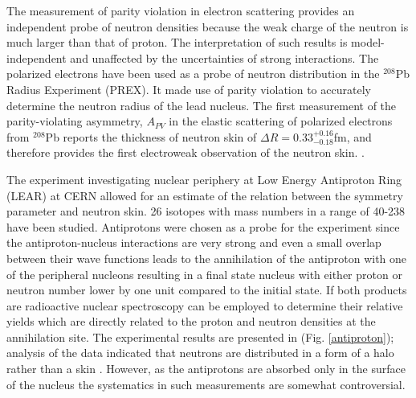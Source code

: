 \indent The measurement of parity violation in electron scattering provides an independent probe of neutron densities because the weak charge of the neutron is much larger than that of proton. The interpretation of such results is model-independent and unaffected by the uncertainties of strong interactions. The polarized electrons have been used as a probe of neutron distribution in the $^{208}$Pb Radius Experiment (PREX). It made use of parity violation to accurately determine the neutron radius of the lead nucleus. The first measurement of the parity-violating asymmetry, $A_{PV}$ in the elastic scattering of polarized electrons from $^{208}$Pb reports the thickness of neutron skin of $\Delta R = 0.33_{-0.18}^{+0.16}$fm, and therefore provides the first electroweak observation of the neutron skin. \cite{prex}.

\indent The experiment investigating nuclear periphery at Low Energy Antiproton Ring (LEAR) at CERN allowed for an estimate of the relation between the symmetry parameter and neutron skin. 26 isotopes with mass numbers in a range of 40-238 have been studied. Antiprotons were chosen as a probe for the experiment since the antiproton-nucleus interactions are very strong and even a small overlap between their wave functions leads to the annihilation of the antiproton with one of the peripheral nucleons resulting in a final state nucleus with either proton or neutron number lower by one unit compared to the initial state. If both products are radioactive nuclear spectroscopy can be employed to determine their relative yields which are directly related to the proton and neutron densities at the annihilation site. The experimental results are presented in (Fig. \ref{antiproton}); analysis of the data indicated that neutrons are distributed in a form of a halo rather than a skin \cite{trzcina}. However, as the antiprotons are absorbed only in the surface of the nucleus the systematics in such measurements are somewhat controversial.

